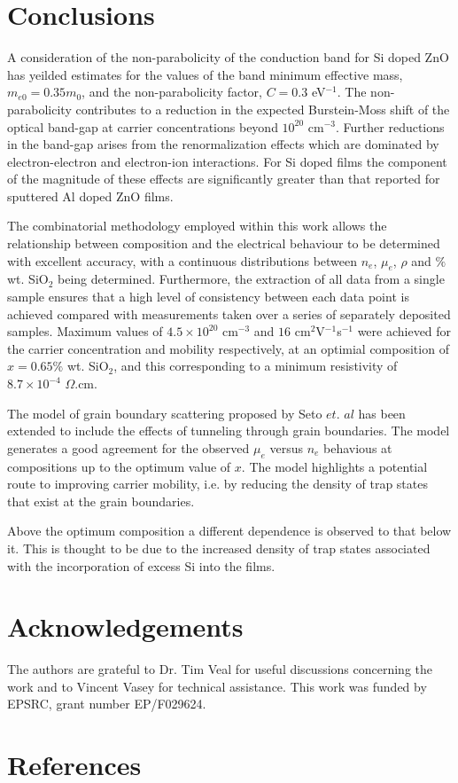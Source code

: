 \documentclass[final,5p,times]{elsarticle}
\begin{document}
\section{Conclusions}
\label{sec:4}
A consideration of the non-parabolicity of the conduction band for Si doped ZnO has yeilded estimates for the values of the band minimum effective mass, $m_{e0} =0.35m_0$, and the non-parabolicity factor, $C=0.3$ eV$^{-1}$. The non-parabolicity contributes to a reduction in the expected Burstein-Moss shift of the optical band-gap at carrier concentrations beyond $10^{20}$ cm$^{-3}$. Further reductions in the band-gap arises from the renormalization effects which are dominated by electron-electron and electron-ion interactions. For Si doped films the component of the magnitude of these effects are significantly greater than that reported for sputtered Al doped ZnO films.

The combinatorial methodology employed within this work allows the relationship between composition and the electrical behaviour to be determined with excellent accuracy, with a continuous distributions between $n_e$, $\mu_e$, $\rho$ and $\%$ wt. SiO$_{2}$ being determined. Furthermore, the extraction of all data from a single sample ensures that a high level of consistency between each data point is achieved compared with measurements taken over a series of separately deposited samples. Maximum values of $4.5\times10^{20}$ cm$^{-3}$ and $16$ cm$^{2}$V$^{-1}$s$^{-1}$ were achieved for the carrier concentration and mobility respectively, at an optimial composition of $x =0.65\%$ wt. SiO$_2$, and this corresponding to a minimum resistivity of $8.7\times10^{-4}$ $\Omega$.cm.

The model of grain boundary scattering proposed by Seto $et.$ $al$ \cite{Seto1975} has been extended to include the effects of tunneling through grain boundaries. The model generates a good agreement for the observed $\mu_e$ versus $n_e$ behavious at compositions up to the optimum value of $x$. The model highlights a potential route to improving carrier mobility, i.e. by reducing the density of trap states that exist at the grain boundaries.

Above the optimum composition a different dependence is observed to that below it. This is thought to be due to the increased density of trap states associated with the incorporation of excess Si into the films.

\section*{Acknowledgements}
The authors are grateful to Dr. Tim Veal for useful discussions concerning the work and to Vincent Vasey for technical assistance. This work was funded by EPSRC, grant number EP/F029624.


\section*{References}



\end{document}
